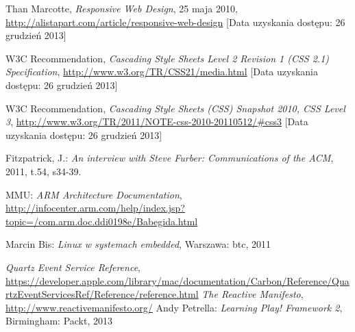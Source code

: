 \begin{thebibliography}{1}
   Than Marcotte, \emph{Responsive Web Design}, 25 maja 2010, \url{http://alistapart.com/article/responsive-web-design} [Data uzyskania dostępu: 26 grudzień 2013]

   W3C Recommendation, \emph{Cascading Style Sheets Level 2 Revision 1 (CSS 2.1) Specification}, \url{http://www.w3.org/TR/CSS21/media.html} [Data uzyskania dostępu: 26 grudzień 2013]

   W3C Recommendation, \emph{Cascading Style Sheets (CSS) Snapshot 2010, CSS Level 3}, \url{http://www.w3.org/TR/2011/NOTE-css-2010-20110512/\#css3} [Data uzyskania dostępu: 26 grudzień 2013]

  Fitzpatrick, J.: \emph{An interview with Steve Furber: Communications of the ACM}, 2011, t.54, s34-39.
  
  MMU: \emph{ARM Architecture Documentation}, \url{http://infocenter.arm.com/help/index.jsp?topic=/com.arm.doc.ddi0198e/Babegida.html}

  Marcin Bis: \emph{Linux w systemach embedded}, Warszawa: btc, 2011

   \emph{Quartz Event Service Reference}, \url{https://developer.apple.com/library/mac/documentation/Carbon/Reference/QuartzEventServicesRef/Reference/reference.html}
   \emph{The Reactive Manifesto}, \url{http://www.reactivemanifesto.org/}
  Andy Petrella: \emph{Learning Play! Framework 2}, Birmingham: Packt, 2013 
\end{thebibliography}
\listoftables

\listoffigures











